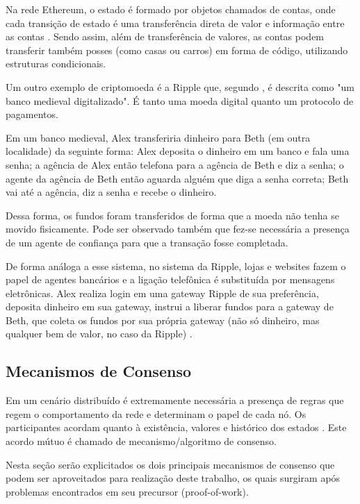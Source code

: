 \documentclass[openright]{normas-utf-tex} %
\begin{document}
Na rede Ethereum, o estado é formado por objetos chamados de contas, onde cada transição de estado é uma transferência direta de valor e informação entre as contas \cite{Community}. Sendo assim, além de transferência de valores, as contas podem transferir também posses (como casas ou carros) em forma de código, utilizando estruturas condicionais. 

Um outro exemplo de criptomoeda é a Ripple que, segundo , é descrita como "um banco medieval digitalizado". É tanto uma moeda digital quanto um protocolo de pagamentos. 

Em um banco medieval, Alex transferiria dinheiro para Beth (em outra localidade) da seguinte forma: Alex deposita o dinheiro em um banco e fala uma senha; a agência de Alex então telefona para a agência de Beth e diz a senha; o agente da agência de Beth então aguarda alguém que diga a senha correta; Beth vai até a agência, diz a senha e recebe o dinheiro. 

Dessa forma, os fundos foram transferidos de forma que a moeda não tenha se movido fisicamente. Pode ser observado também que fez-se necessária a presença de um agente de confiança para que a transação fosse completada.

De forma análoga a esse sistema, no sistema da Ripple, lojas e websites fazem o papel de agentes bancários e a ligação telefônica é substituída por mensagens eletrônicas. Alex realiza login em uma gateway Ripple de sua preferência, deposita dinheiro em sua gateway, instrui a liberar fundos para a gateway de Beth, que coleta os fundos por sua própria gateway (não só dinheiro, mas qualquer bem de valor, no caso da Ripple) \cite{Lewis2014}.

\subsection{Mecanismos de Consenso}

Em um cenário distribuído é extremamente necessária a presença de regras que regem o comportamento da rede e determinam o papel de cada nó. Os participantes acordam quanto à existência, valores e histórico dos estados \cite{Chalaemwongwan2018}. Este acordo mútuo é chamado de mecanismo/algoritmo de consenso. 

Nesta seção serão explicitados os dois principais mecanismos de consenso que podem ser aproveitados para realização deste trabalho, os quais surgiram após problemas encontrados em seu precursor (proof-of-work).
\end{document}
